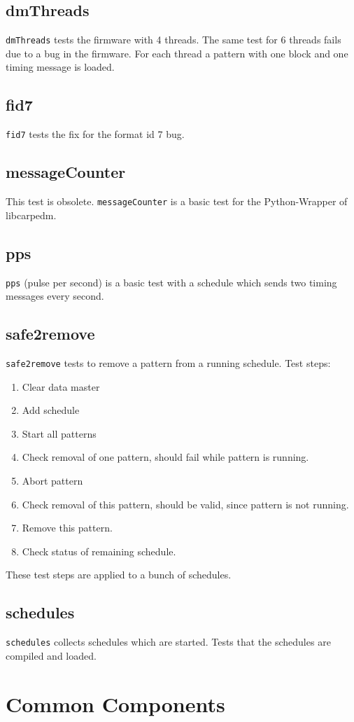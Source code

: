 \documentclass[12pt,a4paper]{report}
\begin{document}
\section{dmThreads}
\texttt{dmThreads} tests the firmware with 4 threads. The same test for 6 threads fails due to a bug in the
firmware. For each thread a pattern with one block and one timing message is loaded.
\section{fid7}
\texttt{fid7} tests the fix for the format id 7 bug.

\section{messageCounter} This test is obsolete.
\texttt{messageCounter} is a basic test for the Python-Wrapper of libcarpedm.
\section{pps}
\texttt{pps} (pulse per second) is a basic test with a schedule which sends two timing messages every second.
\section{safe2remove}
\texttt{safe2remove} tests to remove a pattern from a running schedule. Test steps:
\begin{enumerate}
\item Clear data master
\item Add schedule
\item Start all patterns
\item Check removal of one pattern, should fail while pattern is running.
\item Abort pattern
\item Check removal of this pattern, should be valid, since pattern is not running.
\item Remove this pattern.
\item Check status of remaining schedule.
\end{enumerate}
These test steps are applied to a bunch of schedules.

\section{schedules}
\texttt{schedules} collects schedules which are started. Tests that the schedules are compiled and loaded.
\chapter{Common Components}
\end{document}
